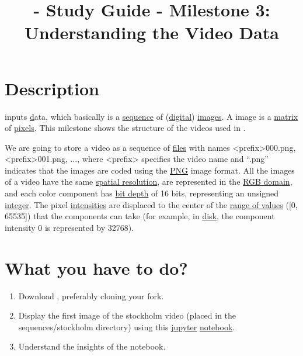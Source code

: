 
\title{\SM{} - Study Guide - Milestone 3: Understanding the Video Data}

\maketitle

\section{Description}

\theproject{} inputs \href{https://en.wikipedia.org/wiki/Video} data,
which basically is a
\href{https://en.wikipedia.org/wiki/Sequence}{sequence} of
(\href{https://en.wikipedia.org/wiki/Digital_data}{digital})
\href{https://en.wikipedia.org/wiki/Image}{images}. A image is a
\href{https://en.wikipedia.org/wiki/Matrix_(mathematics)}{matrix} of
\href{https://en.wikipedia.org/wiki/Pixel}{pixels}. This milestone
shows the structure of the videos used in \theproject{}.

We are going to store a video as a sequence of
\href{https://en.wikipedia.org/wiki/Computer_file}{files} with names
<prefix>000.png, <prefix>001.png, ..., where <prefix> specifies the
video name and ``.png'' indicates that the images are coded using the
\href{https://en.wikipedia.org/wiki/Portable_Network_Graphics}{PNG}
image format. All the images of a video have the same
\href{https://en.wikipedia.org/wiki/Image_resolution}{spatial
  resolution}, are represented in the
\href{https://en.wikipedia.org/wiki/RGB_color_model}{RGB domain}, and
each color component has
\href{https://en.wikipedia.org/wiki/Glossary_of_computer_graphics#bit_depth}{bit
  depth} of 16 bits, representing an unsigned
\href{https://en.wikipedia.org/wiki/Integer_(computer_science)}{integer}. The
pixel
\href{https://en.wikipedia.org/wiki/Luminous_intensity}{intensities}
are displaced to the center of the
\href{https://en.wikipedia.org/wiki/Range_(computer_programming)}{range
  of values} ([0, 65535]) that the components can take (for example,
in \href{https://en.wikipedia.org/wiki/Disk_storage}{disk}, the
component intensity 0 is represented by 32768).

\section{What you have to do?}

\begin{enumerate}
\item Download \theproject, preferably cloning your fork.
\item Display the first image of the stockholm video (placed in the
  sequences/stockholm directory) using this
  \href{https://jupyter.org/}{jupyter} \href{}{notebook}.
\item Understand the insights of the notebook.
\end{enumerate}

